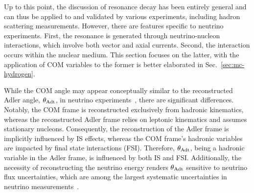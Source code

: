 Up to this point, the discussion of resonance decay has been entirely general and can thus be applied to and validated by various experiments, including hadron scattering measurements. 
However, there are features specific to neutrino experiments. 
First, the resonance is generated through neutrino-nucleon interactions, which involve both vector and axial currents. 
Second, the interaction occurs within the nuclear medium. 
This section focuses on the latter, with the application of COM variables to the former is better elaborated in Sec.~\ref{sec:mc-hydrogen}.

While the COM angle may appear conceptually similar to the reconstructed Adler angle, $\theta_{\textrm{Adt}}$, in neutrino experiments~\cite{Sanchez:2015yvw}, there are significant differences. 
Notably, the COM frame is reconstructed exclusively from hadronic kinematics, whereas the reconstructed Adler frame relies on leptonic kinematics and assumes stationary nucleons. 
Consequently, the reconstruction of the Adler frame is implicitly influenced by IS effects, whereas the COM frame's hadronic variables are impacted by final state interactions (FSI). 
Therefore, $\theta_{\textrm{Adt}}$, being a hadronic variable in the Adler frame, is influenced by both IS and FSI. 
Additionally, the necessity of reconstructing the neutrino energy renders $\theta_{\textrm{Adt}}$ sensitive to neutrino flux uncertainties, which are among the largest systematic uncertainties in neutrino measurements~\cite{T2K:2019yqu,T2K:2021naz,MicroBooNECollaboration:2024gvg,NOvA:2023uxq,MINERvA:2022djk}.


